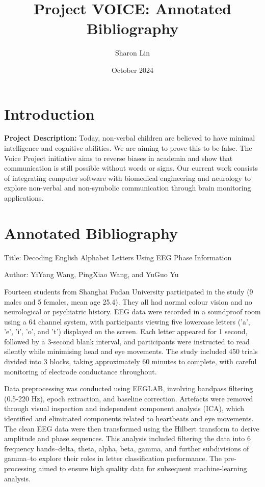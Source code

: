 \documentclass[12pt, research paper]{report}
\title{Project VOICE: Annotated Bibliography}
\author{Sharon Lin}
\date{October 2024}
\begin{document}
	
	\maketitle
	
	\section*{Introduction}
	
	\noindent\textbf{Project Description:} Today, non-verbal children are believed to have minimal intelligence and cognitive abilities. We are aiming to prove this to be false. The Voice Project initiative aims to reverse biases in academia and show that communication is still possible without words or signs. Our current work consists of integrating computer software with biomedical engineering and neurology to explore non-verbal and non-symbolic communication through brain monitoring applications.
	
	\vspace{10pt}
	
	\section*{Annotated Bibliography} 
	Title: Decoding English Alphabet Letters Using EEG Phase Information
	
	\noindent Author: YiYang Wang, PingXiao Wang, and YuGuo Yu
	
	Fourteen students from Shanghai Fudan University participated in the study (9 males and 5 females, mean age 25.4). They all had normal colour vision and no neurological or psychiatric history. EEG data were recorded in a soundproof room using a 64 channel system, with participants viewing five lowercase letters ('a', 'e', 'i', 'o', and 't') displayed on the screen. Each letter appeared for 1 second, followed by a 3-second blank interval, and participants were instructed to read silently while minimising head and eye movements. The study included 450 trials divided into 3 blocks, taking approximately 60 minutes to complete, with careful monitoring of electrode conductance throughout. 
	
	Data preprocessing was conducted using EEGLAB, involving bandpass filtering (0.5-220 Hz), epoch extraction, and baseline correction. Artefacts were removed through visual inspection and independent component analysis (ICA), which identified and eliminated components related to heartbeats and eye movements. The clean EEG data were then transformed using the Hilbert transform to derive amplitude and phase sequences. This analysis included filtering the data into 6 frequency bands--delta, theta, alpha, beta, gamma, and further subdivisions of gamma--to explore their roles in letter classification performance. The pre-processing aimed to ensure high quality data for subsequent machine-learning analysis. 
	
\end{document}
